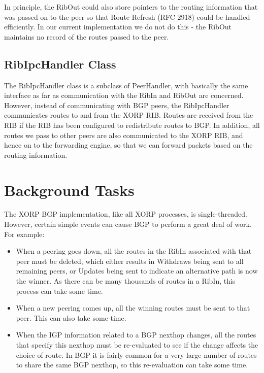 \documentclass[11pt]{article}
\begin{document}
In principle, the RibOut could also store pointers to the routing
information that was passed on to the peer so that Route Refresh
(RFC 2918) could be handled efficiently.  In our current implementation
we do not do this - the RibOut maintains no record of the routes
passed to the peer.

\subsection{RibIpcHandler Class}

The RibIpcHandler class is a subclass of PeerHandler, with basically
the same interface as far as communication with the RibIn and RibOut
are concerned. However, instead of communicating with BGP peers, the
RibIpcHandler communicates routes to and from the XORP RIB.  Routes
are received from the RIB if the RIB has been configured to
redistribute routes to BGP.  In addition, all routes we pass to other
peers are also communicated to the XORP RIB, and hence on to the
forwarding engine, so that we can forward packets based on the routing
information.

\section{Background Tasks}

The XORP BGP implementation, like all XORP processes, is
single-threaded.  However, certain simple events can cause BGP to
perform a great deal of work.  For example:

\begin{itemize}

  \item When a peering goes down, all the routes in the RibIn associated
  with that peer must be deleted, which either results in Withdraws
  being sent to all remaining peers, or Updates being sent to indicate
  an alternative path is now the winner.  As there can be many thousands
  of routes in a RibIn, this process can take some time.

  \item When a new peering comes up, all the winning routes must be sent
  to that peer.  This can also take some time.

  \item When the IGP information related to a BGP nexthop changes, all
  the routes that specify this nexthop must be re-evaluated to see if
  the change affects the choice of route.  In BGP it is fairly common
  for a very large number of routes to share the same BGP nexthop, so
  this re-evaluation can take some time.

\end{itemize}
\end{document}
